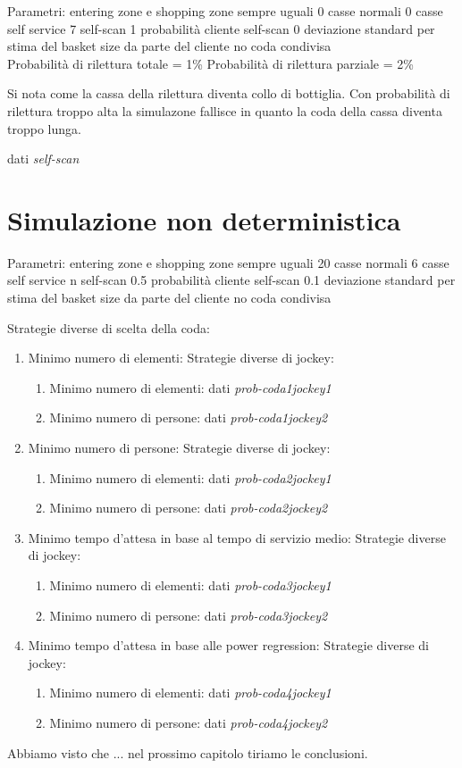 Parametri:
entering zone e shopping zone sempre uguali
0 casse normali
0 casse self service
7 self-scan
1 probabilità cliente self-scan
0 deviazione standard per stima del basket size da parte del cliente
no coda condivisa
\\
Probabilità di rilettura totale = 1\%
Probabilità di rilettura parziale = 2\%

Si nota come la cassa della rilettura diventa collo di bottiglia. Con probabilità di rilettura troppo alta la simulazone fallisce in quanto la coda della cassa diventa troppo lunga.

dati \textit{self-scan}

\section{Simulazione non deterministica}

Parametri:
entering zone e shopping zone sempre uguali
20 casse normali
6 casse self service
n self-scan
0.5 probabilità cliente self-scan
0.1 deviazione standard per stima del basket size da parte del cliente
no coda condivisa

Strategie diverse di scelta della coda:
\begin{enumerate}
	\item Minimo numero di elementi:
	Strategie diverse di jockey:
	\begin{enumerate}
		\item Minimo numero di elementi: dati \textit{prob-coda1jockey1}
		\item Minimo numero di persone: dati \textit{prob-coda1jockey2}
	\end{enumerate}
	\item Minimo numero di persone:
	Strategie diverse di jockey:
	\begin{enumerate}
		\item Minimo numero di elementi: dati \textit{prob-coda2jockey1}
		\item Minimo numero di persone: dati \textit{prob-coda2jockey2}
	\end{enumerate}
	\item Minimo tempo d'attesa in base al tempo di servizio medio:
	Strategie diverse di jockey:
	\begin{enumerate}
		\item Minimo numero di elementi: dati \textit{prob-coda3jockey1}
		\item Minimo numero di persone: dati \textit{prob-coda3jockey2}
	\end{enumerate}
	\item Minimo tempo d'attesa in base alle power regression: Strategie diverse di jockey:
	\begin{enumerate}
		\item Minimo numero di elementi: dati \textit{prob-coda4jockey1}
		\item Minimo numero di persone: dati \textit{prob-coda4jockey2}
	\end{enumerate}
\end{enumerate}

\vspace*{1\baselineskip}



Abbiamo visto che ... nel prossimo capitolo tiriamo le conclusioni.
